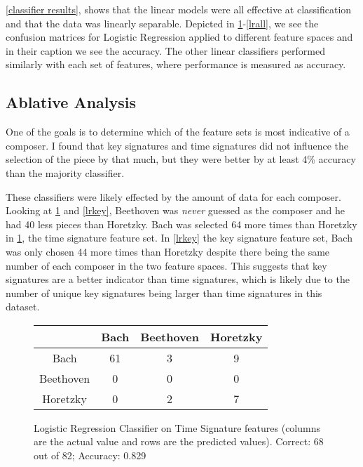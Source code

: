 \documentclass[10pt]{IEEEtran}
\begin{document}
\cref{classifier results}, shows that the linear models were all effective at
classification and that the data was linearly separable. Depicted in
\cref{lrtime}-\cref{lrall}, we see the confusion matrices for Logistic
Regression applied to different feature spaces and in their caption we see the
accuracy. The other linear classifiers performed similarly with each set of
features, where performance is measured as accuracy.

\subsection{Ablative Analysis}

One of the goals is to determine which of the feature sets is most indicative
of a composer. I found that key signatures and time signatures did not influence
the selection of the piece by that much, but they were better by at least 4\%
accuracy than the majority classifier.

These classifiers were likely effected by the amount of data for each composer.
Looking at \cref{lrtime} and \cref{lrkey}, Beethoven was {\it never} guessed as
the composer and he had 40 less pieces than Horetzky. Bach was selected 64 more
times than Horetzky in \cref{lrtime}, the time signature feature set. In
\cref{lrkey} the key signature feature set, Bach was only chosen 44 more times
than Horetzky despite there being the same number of each composer in the two
feature spaces. This suggests that key signatures are a better indicator than
time signatures, which is likely due to the number of unique key signatures
being larger than time signatures in this dataset.

\begin{figure}[!t]
  \begin{center}
    \begin{tabular}{c | c c c}
      & Bach  & Beethoven & Horetzky \\
      \hline
      Bach      & 61 & 3 & 9 \\
      Beethoven & 0  & 0 & 0 \\
      Horetzky  & 0  & 2 & 7
    \end{tabular}
  \end{center}
  \caption{
    Logistic Regression Classifier on Time Signature features (columns are the
    actual value and rows are the predicted values).
    Correct: 68 out of 82;
    Accuracy: 0.829
    \label{lrtime}
  }
\end{figure}
\end{document}
